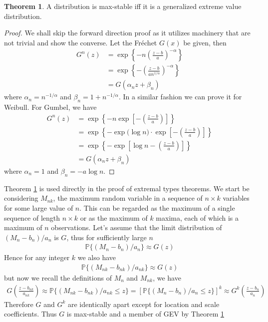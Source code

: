 \documentclass[a4paper,10pt]{article}
\theoremstyle{definition}
\newtheorem{thm}{Theorem}[section]
\numberwithin{equation}{section}
\begin{document}
\begin{thm}\label{thm:maxstablegev}
A distribution is max-stable iff it is a generalized extreme value distribution.
\begin{proof}
We shall skip the forward direction proof as it utilizes machinery that are not trivial and show the converse. Let the Fr\'echet $G(x)$ be given, then 	
\begin{align*}
G^n(z) &= \exp\left\{-n\left(\frac{z-b}{a}\right)^{-\alpha}\right\}\\
&= \exp\left\{-\left(\frac{z-b}{an^{1/\alpha}}\right)^{-\alpha}\right\}\\
&=G(\alpha_nz+\beta_n)
\end{align*}
where $\alpha_n = n^{-1/\alpha}$ and $\beta_n = 1 +  n^{-1/\alpha}$. In a similar fashion we can prove it for Weibull. For Gumbel, we have
\begin{align*}
G^n(z) &= \exp\left\{-n\exp\left[-\left(\frac{z-b}{a}\right)\right]\right\} \\
&= \exp\left\{-\exp\Big(\log n\Big)\cdot\exp\left[-\left(\frac{z-b}{a}\right)\right]\right\}\\
&= \exp\left\{-\exp\left[\log n-\left(\frac{z-b}{a}\right)\right]\right\} \\
&=G(\alpha_nz+\beta_n)
\end{align*}
where $\alpha_n = 1$ and $\beta_n = -a\log n$.
\end{proof}
\end{thm}

Theorem \ref{thm:maxstablegev} is used directly in the proof of extremal types theorems. We start be considering $M_{nk}$, the maximum random variable in a sequence of $n \times k$ variables for some large value of $n$. This can be regarded as the maximum of a single sequence of length $n \times k$ or as the maximum of $k$ maxima, each of which is a maximum of $n$ observations. Let's assume that the limit distribution of $(M_n-b_n)/a_n$ is $G$, thus for sufficiently large $n$
\begin{align*}
\mathbb{P}\{(M_n-b_n)/a_n\} \approx G(z)
\end{align*}
Hence for any integer $k$ we also have 
\begin{align*}
\mathbb{P}\{(M_{nk}-b_{nk})/a_{nk}\} \approx G(z)
\end{align*}
but now we recall the definitions of $M_n$ and $M_{nk}$, we have 
\begin{align*}
G\left(\frac{z-b_{nk}}{a_{nk}}\right)\approx\mathbb{P}\{(M_{nk}-b_{nk})/a_{nk}\leq z\}=\left[\mathbb{P}\{(M_{n}-b_{n})/a_{n}\leq z\}\right]^k \approx G^k\left(\frac{z-b_n}{a_n}\right)
\end{align*}
Therefore $G$ and $G^k$ are identically apart except for location and scale coefficients. Thus $G$ is max-stable and a member of GEV by Theorem \ref{thm:maxstablegev}
\end{document}
